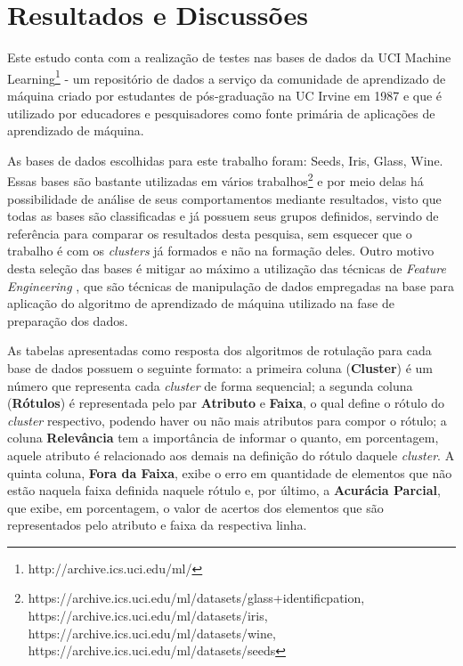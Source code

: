  \chapter{Resultados e Discussões}\label{cap:resultados}


Este estudo conta com a realização de testes nas bases de dados da UCI Machine Learning\footnote{http://archive.ics.uci.edu/ml/} - um repositório de dados a serviço da comunidade de aprendizado de máquina criado por estudantes de pós-graduação na UC Irvine em 1987 e que é utilizado por educadores e pesquisadores como fonte primária de aplicações de aprendizado de máquina. 
 


As bases de dados escolhidas para este trabalho foram: Seeds, Iris, Glass, Wine. Essas bases são bastante utilizadas em vários trabalhos\footnote{https://archive.ics.uci.edu/ml/datasets/glass+identificpation, https://archive.ics.uci.edu/ml/datasets/iris, https://archive.ics.uci.edu/ml/datasets/wine, https://archive.ics.uci.edu/ml/datasets/seeds} e por meio delas há possibilidade de análise de seus comportamentos mediante resultados, visto que todas as bases são classificadas e já possuem seus grupos definidos, servindo de referência para comparar os resultados desta pesquisa, sem esquecer que o trabalho é com os \textit{clusters} já formados e não na formação deles. Outro motivo desta seleção das bases é mitigar ao máximo a utilização das técnicas de \textit{Feature Engineering} \cite{Casari2018}, que são técnicas de manipulação de dados empregadas na base para aplicação do algoritmo de aprendizado de máquina utilizado na fase de preparação dos dados. 



As tabelas apresentadas como resposta dos algoritmos de rotulação para cada base de dados possuem o seguinte formato: a primeira coluna (\textbf{Cluster}) é um número que representa cada \textit{cluster} de forma sequencial; a segunda coluna (\textbf{Rótulos}) é representada pelo par \textbf{Atributo} e \textbf{Faixa}, o qual define o rótulo do \textit{cluster} respectivo, podendo haver ou não mais atributos para compor o rótulo; a coluna \textbf{Relevância} tem a importância de informar o quanto, em porcentagem, aquele atributo é relacionado aos demais na definição do rótulo daquele \textit{cluster}. A quinta coluna, \textbf{Fora da Faixa}, exibe o erro em quantidade de elementos que não estão naquela faixa definida naquele rótulo e, por último, a \textbf{Acurácia Parcial}, que exibe, em porcentagem, o valor de acertos dos elementos que são representados pelo atributo e faixa da respectiva linha. 


